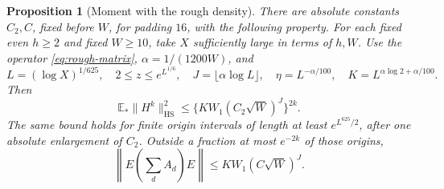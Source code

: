 \documentclass[11pt]{article}
\newtheorem{proposition}[theorem]{Proposition}
\theoremstyle{definition}
\newcommand{\E}{\mathbb E}
\DeclareMathOperator{\HS}{HS}
\theoremstyle{remark}
\numberwithin{equation}{section}
\begin{document}
\begin{proposition}[Moment with the rough density]\label{prop:masked-moment}
There are absolute constants $C_2,C$, fixed before $W$, for padding $16$, with the following property.
For each fixed even $h\ge2$ and fixed $W\ge10$, take $X$ sufficiently large in terms of $h,W$.
Use the operator \eqref{eq:rough-matrix}, $\alpha=1/(1200W)$, and
\begin{equation}\label{eq:masked-graph-parameters}
 L=(\log X)^{1/625},\quad 2\le z\le e^{L^{1/6}},\quad
 J=\lfloor\alpha\log L\rfloor,\quad\eta=L^{-\alpha/100},\quad
 K=L^{\alpha\log2+\alpha/100}.
\end{equation}
Then
\begin{equation}\label{eq:masked-moment}
 \E_*\|H^k\|_{\HS}^2\le\{KW_1(C_2\sqrt W)^J\}^{2k}.
\end{equation}
The same bound holds for finite origin intervals of length at least $e^{L^{625}/2}$, after one absolute
enlargement of $C_2$. Outside a fraction at most $e^{-2k}$ of those origins,
\begin{equation}\label{eq:masked-spectrum}
 \left\|E\left(\sum_dA_d\right)E\right\|\le KW_1(C\sqrt W)^J.
\end{equation}
\end{proposition}
\end{document}
